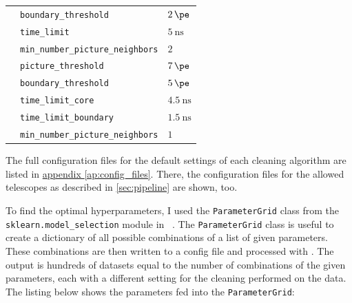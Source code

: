 \begin{table}
{\begin{tabular}{l l l}
                    & \texttt{boundary\_threshold}              & \qquad\(\SI{2}{\pe}\) \\
                    & \texttt{time\_limit}                      & \qquad\(\SI{5}{\nano\second}\) \\
                    & \texttt{min\_number\_picture\_neighbors}  & \qquad\(\num{2}\) \\
        \addlinespace[0.5em]
        \tcc{}      & \texttt{picture\_threshold}               & \qquad\(\SI{7}{\pe}\) \\
                    & \texttt{boundary\_threshold}              & \qquad\(\SI{5}{\pe}\) \\
                    & \texttt{time\_limit\_core}                & \qquad\(\SI{4.5}{\nano\second}\) \\
                    & \texttt{time\_limit\_boundary}            & \qquad\(\SI{1.5}{\nano\second}\) \\
                    & \texttt{min\_number\_picture\_neighbors}  & \qquad\(\num{1}\) \\
  \end{tabular}}
\end{table}
The full configuration files for the default settings of each cleaning algorithm are listed in
\hyperref[ap:config_files]{appendix \ref{ap:config_files}}. There, the configuration files for the allowed telescopes
as described in \autoref{sec:pipeline} are shown, too.

To find the optimal hyperparameters, I used the \texttt{ParameterGrid} class from the
\texttt{sklearn.model\_selection} module in \sklearn{}~\cite{scikit-learn}. The \texttt{ParameterGrid} class is useful to create a
dictionary of all possible combinations of a list of given parameters. These combinations are then
written to a config file and processed with \ctapipe{}. The output is hundreds of datasets equal to
the number of combinations of the given parameters, each with a different setting for the cleaning
performed on the data. The listing below shows the parameters fed into the \texttt{ParameterGrid}:
\begin{mdframed}[backgroundcolor=white!20!black,leftmargin=0cm,rightmargin=0cm, skipabove=0pt, innerleftmargin=0,innerrightmargin=0,]
\end{mdframed}

